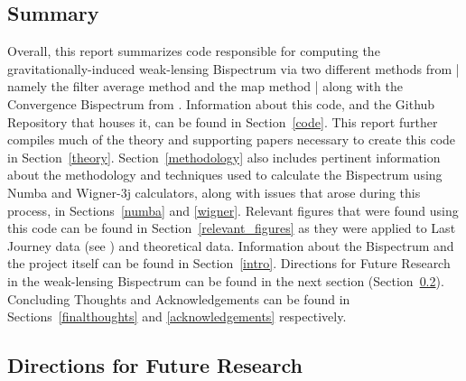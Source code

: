 \documentclass[11pt]{article}
\renewcommand{\_}[1]{\underline{ #1 }}
\begin{document}
{\subsection{Summary}

Overall, this report summarizes code responsible for computing the gravitationally-induced weak-lensing Bispectrum via two different methods from \cite{Munshi_2020} | namely the filter average method and the map method | along with the Convergence Bispectrum from \cite{Namikawa_2019}. Information about this code, and the Github Repository that houses it, can be found in Section~\ref{code}. This report further compiles much of the theory and supporting papers necessary to create this code in Section~\ref{theory}. Section~\ref{methodology} also includes pertinent information about the methodology and techniques used to calculate the Bispectrum using Numba and Wigner-3j calculators, along with issues that arose during this process, in Sections~\ref{numba} and \ref{wigner}. Relevant figures that were found using this code can be found in Section~\ref{relevant_figures} as they were applied to Last Journey data (see \cite{Heitmann_2021}) and theoretical data. Information about the Bispectrum and the project itself can be found in Section~\ref{intro}. Directions for Future Research in the weak-lensing Bispectrum can be found in the next section (Section~\ref{future_research}). Concluding Thoughts and Acknowledgements can be found in Sections~\ref{finalthoughts} and \ref{acknowledgements} respectively.

\subsection{Directions for Future Research}\label{future_research}

}
\end{document}
